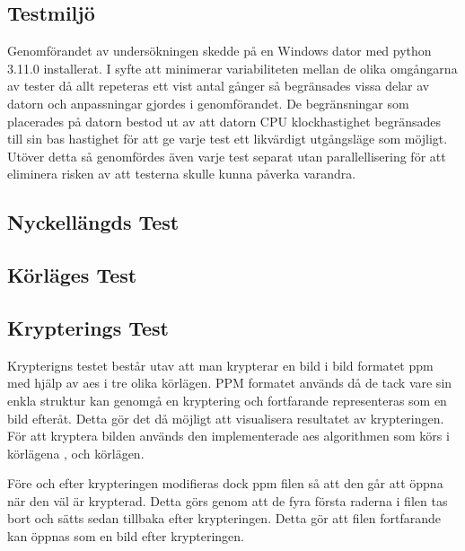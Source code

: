 \subsection{Testmiljö} %
Genomförandet av undersökningen skedde på en Windows dator med \gls{python} 3.11.0 installerat. I syfte att minimerar variabiliteten
mellan de olika omgångarna av tester då allt repeteras ett vist antal gånger så begränsades vissa delar av datorn och anpassningar gjordes i genomförandet.
De begränsningar som placerades på datorn bestod ut av att datorn CPU klockhastighet begränsades till sin bas hastighet för att ge
varje test ett likvärdigt utgångsläge som möjligt. Utöver detta så genomfördes även varje test separat utan parallellisering för att
eliminera risken av att testerna skulle kunna påverka varandra.

\subsection{Nyckellängds Test} %
\label{sec:nyckellangd-test}


\subsection{Körläges Test} %
\label{sec:körlages-test}


\subsection{Krypterings Test} %
\label{sec:krypterings-test}
Krypterigns testet består utav att man krypterar en bild i bild formatet \gls{ppm} med hjälp av \acrshort{aes} i tre olika körlägen.
PPM formatet används då de tack vare sin enkla struktur kan genomgå en kryptering och fortfarande representeras som en bild
efteråt. Detta gör det då möjligt att visualisera resultatet av krypteringen. För att kryptera bilden används den implementerade
\acrshort{aes} algorithmen som körs i körlägena ,  och  körlägen.

Före och efter krypteringen modifieras dock \gls{ppm} filen så att den går att öppna när den väl är krypterad. Detta görs genom att de fyra
första raderna i filen tas bort och sätts sedan tillbaka efter krypteringen. Detta gör att filen fortfarande kan öppnas som en bild
efter krypteringen.

